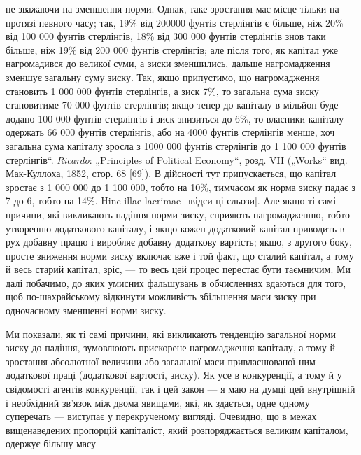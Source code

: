 {не зважаючи на зменшення норми. Однак, таке зростання має місце тільки на
протязі певного часу; так, 19\% від 200000 фунтів стерлінгів є більше, ніж 20\%
від 100 000 фунтів стерлінгів, 18\% від 300 000 фунтів стерлінгів знов таки
більше, ніж 19\% від 200 000 фунтів стерлінгів; але після того, як капітал уже
нагромадився до великої суми, а зиски зменшились, дальше нагромадження
зменшує загальну суму зиску. Так, якщо припустимо, що нагромадження
становить 1 000 000 фунтів стерлінгів, а зиск 7\%, то загальна сума зиску становитиме
70 000 фунтів стерлінгів; якщо тепер до капіталу в мільйон буде
додано 100 000 фунтів стерлінгів і зиск знизиться до 6\%, то власники капіталу
одержать 66 000 фунтів стерлінгів, або на 4000 фунтів стерлінгів менше, хоч
загальна сума капіталу зросла з 1000 000 фунтів стерлінгів до 1 100 000 фунтів
стерлінгів“. \emph{Ricardo}: „Principles of Political Economy“, розд. VII („Works“
вид. Мак-Куллоха, 1852, стор. 68 [69]). В дійсності тут припускається, що капітал
зростає з 1 000 000 до 1 100 000, тобто на 10\%, тимчасом як норма зиску
падає з 7 до 6, тобто на 14\%. Hinc illae lacrimae [звідси ці сльози].} Але
якщо ті самі причини, які викликають падіння норми зиску,
сприяють нагромадженню, тобто утворенню додаткового капіталу,
і якщо кожен додатковий капітал приводить в рух добавну
працю і виробляє добавну додаткову вартість; якщо, з другого
боку, просте зниження норми зиску включає вже і той
факт, що сталий капітал, а тому й весь старий капітал, зріс, —
то весь цей процес перестає бути таємничим. Ми далі побачимо,
до яких умисних фальшувань в обчисленнях вдаються
для того, щоб по-шахрайському відкинути можливість збільшення
маси зиску при одночасному зменшенні норми зиску.

Ми показали, як ті самі причини, які викликають тенденцію
загальної норми зиску до падіння, зумовлюють прискорене нагромадження
капіталу, а тому й зростання абсолютної величини або
загальної маси привласнюваної ним додаткової праці (додаткової
вартості, зиску). Як усе в конкуренції, а тому й у свідомості
агентів конкуренції, так і цей закон — я маю на думці цей внутрішній
і необхідний зв’язок між двома явищами, які, як здається,
одне одному суперечать — виступає у перекрученому вигляді.
Очевидно, що в межах вищенаведених пропорцій капіталіст,
який розпоряджається великим капіталом, одержує більшу масу
\parbreak{}  %
